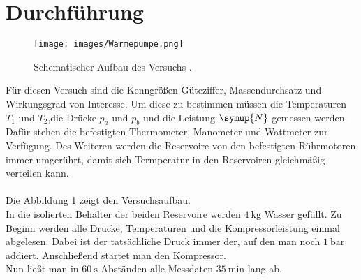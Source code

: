 \section{Durchführung}



\begin{figure}
    \centering
    \texttt{[image: images/Wärmepumpe.png]}
    \caption{Schematischer Aufbau des Versuchs \protect \footnotemark[2].}
    \label{img:pump2}
\end{figure}

Für diesen Versuch sind die Kenngrößen Güteziffer, Massendurchsatz und Wirkungsgrad von Interesse.
Um diese zu bestimmen müssen die Temperaturen $T_1$ und $T_2$,die Drücke $p_a$ und $p_b$ und die Leistung $\symup{N}$ gemessen werden.\\
Dafür stehen die befestigten Thermometer, Manometer und Wattmeter zur Verfügung.
Des Weiteren werden die Reservoire von den befestigten Rührmotoren
immer umgerührt, damit sich Termperatur in den Reservoiren gleichmäßig verteilen kann.\\\\

Die Abbildung \ref{img:pump2} zeigt den Versuchsaufbau.\\
In die isolierten Behälter der beiden Reservoire werden $\SI{4}{\kilo\gram}$ Wasser gefüllt.
Zu Beginn werden alle Drücke, Temperaturen und die Kompressorleistung einmal abgelesen.
Dabei ist der tatsächliche Druck immer der, auf den man noch $\SI{1}{\bar}$ addiert.
Anschließend startet man den Kompressor.\\
Nun ließt man in $\SI{60}{\second}$ Abständen alle Messdaten $\SI{35}{\minute}$ lang ab.